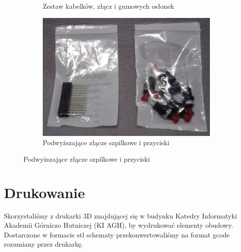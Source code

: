 \begin{figure}[H]
\begin{subfigure}{0.32\textwidth}
        \caption*{Zestaw kabelków, złącz i gumowych osłonek}
    \end{subfigure}
    \begin{subfigure}{0.32\textwidth}
        \centering
        \includegraphics[width=0.9\linewidth]{photos/buttons.png}
        \caption*{Podwyższające złącze szpilkowe i przyciski}
    \end{subfigure}
\end{figure}

\section{Drukowanie}\label{sec:cover_printing}

Skorzystaliśmy z drukarki 3D znajdującej się w budynku Katedry Informatyki Akademii Górniczo
Hutniczej (KI AGH), by wydrukować elementy obudowy. Dostarczone w formacie stl schematy
przekonwertowaliśmy na format gcode rozumiany przez drukarkę.

